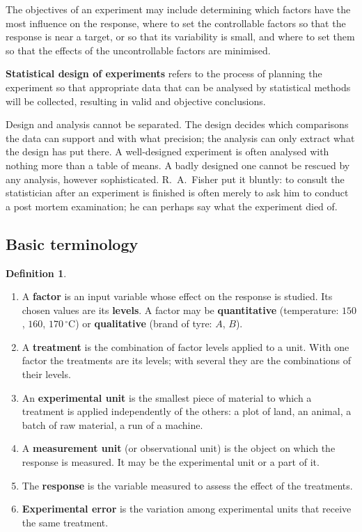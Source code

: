 \documentclass[11pt,a4paper]{article}
\numberwithin{equation}{section}
\theoremstyle{definition}
\newtheorem{defn}[thm]{Definition}
\begin{document}
The objectives of an experiment may include determining which factors have the most influence on the response, where to set the
controllable factors so that the response is near a target, or so that its variability is small, and where to set them so that the effects of the
uncontrollable factors are minimised.

\textbf{Statistical design of experiments} refers to the process of planning the experiment so that appropriate data that can be analysed by
statistical methods will be collected, resulting in valid and objective conclusions.

Design and analysis cannot be separated. The design decides which comparisons the data can support and with what precision; the analysis
can only extract what the design has put there. A well-designed experiment is often analysed with nothing more than a table of means. A badly
designed one cannot be rescued by any analysis, however sophisticated. R.~A.~Fisher put it bluntly: to consult the statistician after an
experiment is finished is often merely to ask him to conduct a post mortem examination; he can perhaps say what the experiment died of.

\subsection{Basic terminology}
\begin{defn}
\begin{enumerate}[label=(\roman*)]
\item A \textbf{factor} is an input variable whose effect on the response is studied. Its chosen values are its \textbf{levels}. A factor may be
\textbf{quantitative} (temperature: $150$, $160$, $170\,^\circ$C) or \textbf{qualitative} (brand of tyre: $A$, $B$).
\item A \textbf{treatment} is the combination of factor levels applied to a unit. With one factor the treatments are its levels; with several
they are the combinations of their levels.
\item An \textbf{experimental unit} is the smallest piece of material to which a treatment is applied independently of the others: a plot of land, an animal,
a batch of raw material, a run of a machine.
\item A \textbf{measurement unit} (or observational unit) is the object on which the response is measured. It may be the experimental unit
or a part of it.
\item The \textbf{response} is the variable measured to assess the effect of the treatments.
\item \textbf{Experimental error} is the variation among experimental units that receive the same treatment.
\end{enumerate}
\end{defn}
\end{document}
